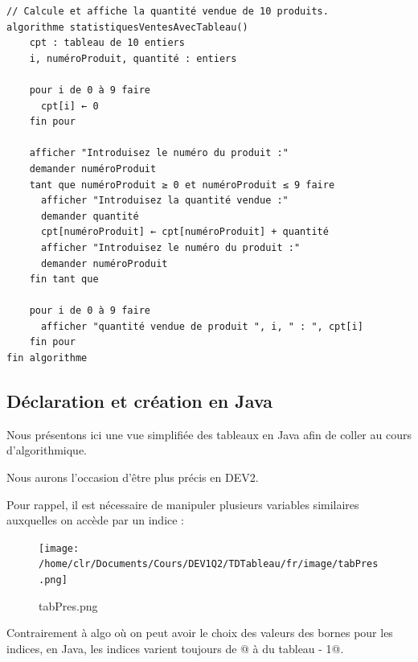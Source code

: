 \documentclass[11pt,a4paper]{article}
\begin{document}
            \par
        \begin{verbatim}
// Calcule et affiche la quantité vendue de 10 produits.
algorithme statistiquesVentesAvecTableau()
    cpt : tableau de 10 entiers
    i, numéroProduit, quantité : entiers
    
    pour i de 0 à 9 faire
      cpt[i] ← 0
    fin pour
    
    afficher "Introduisez le numéro du produit :"
    demander numéroProduit
    tant que numéroProduit ≥ 0 et numéroProduit ≤ 9 faire
      afficher "Introduisez la quantité vendue :"
      demander quantité
      cpt[numéroProduit] ← cpt[numéroProduit] + quantité
      afficher "Introduisez le numéro du produit :"
      demander numéroProduit
    fin tant que
    
    pour i de 0 à 9 faire
      afficher "quantité vendue de produit ", i, " : ", cpt[i]
    fin pour
fin algorithme
      \end{verbatim}\subsection{D\'eclaration et cr\'eation en Java}
		    Nous pr\'esentons ici une vue simplifi\'ee  des tableaux en Java afin de coller
        au cours d'algorithmique.
      
            \par
        
        Nous aurons l'occasion d'\^etre plus pr\'ecis en DEV2.
      
            \par
        
        Pour rappel, il est n\'ecessaire de manipuler plusieurs variables similaires
        auxquelles on acc\`ede par un indice :
      
            \par
        \begin{figure}[hbt]
				    \begin{center}
					\texttt{[image: /home/clr/Documents/Cours/DEV1Q2/TDTableau/fr/image/tabPres.png]}
						\end{center}
                
                    \caption[tabPres.png]{tabPres.png}
                \end{figure}
                    
            \par
        
        Contrairement \`a algo o\`u on peut avoir le choix des valeurs des bornes pour les indices, 
        en Java, les indices varient toujours de @ \`a \verb@taille du tableau - 1@.
      
\end{document}
